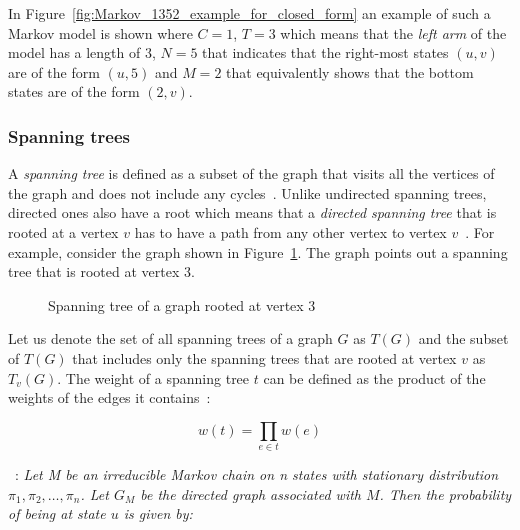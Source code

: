 In Figure~\ref{fig:Markov_1352_example_for_closed_form} an example of such a
Markov model is shown where \(C=1\), \(T=3\) which means that the \textit{left
arm} of the model has a length of \(3\), \(N=5\) that indicates that the
right-most states \((u,v)\) are of the form \((u,5)\) and \(M=2\) that
equivalently shows that the bottom states are of the form \((2,v)\).

\subsubsection{Spanning trees}

A \textit{spanning tree} is defined as a subset of the graph that visits all
the vertices of the graph and does not include any
cycles~\cite{bollobas1998modern}.
Unlike undirected spanning trees, directed ones also have a root which means
that a \textit{directed spanning tree} that is rooted at a vertex \(v\) has to
have a path from any other vertex to vertex \(v\)~\cite{levine2011sandpile}.
For example, consider the graph shown in Figure~\ref{fig:example_spanning_tree}.
The graph points out a spanning tree that is rooted at vertex 3.


\begin{figure}[H]
    \centering
    \caption{Spanning tree of a graph rooted at vertex 3}
    \label{fig:example_spanning_tree}
\end{figure}

Let us denote the set of all spanning trees of a graph \(G\) as \(T(G)\)
and the subset of \(T(G)\) that includes only the spanning trees that are rooted
at vertex \(v\) as \(T_v(G)\).
The weight of a spanning tree \(t\) can be defined as the product of the weights
of the edges it contains~\cite{williams2022combinatorics}:

\[
    w(t)=\prod_{e \in t} w(e)
\]


~\cite{broder1989generating}:
\textit{Let M be an irreducible Markov chain on n states with stationary
distribution \(\pi_1, \pi_2, \dots, \pi_n\).
Let \(G_M\) be the directed graph associated with \(M\).
Then the probability of being at state \(u\) is given by:}

